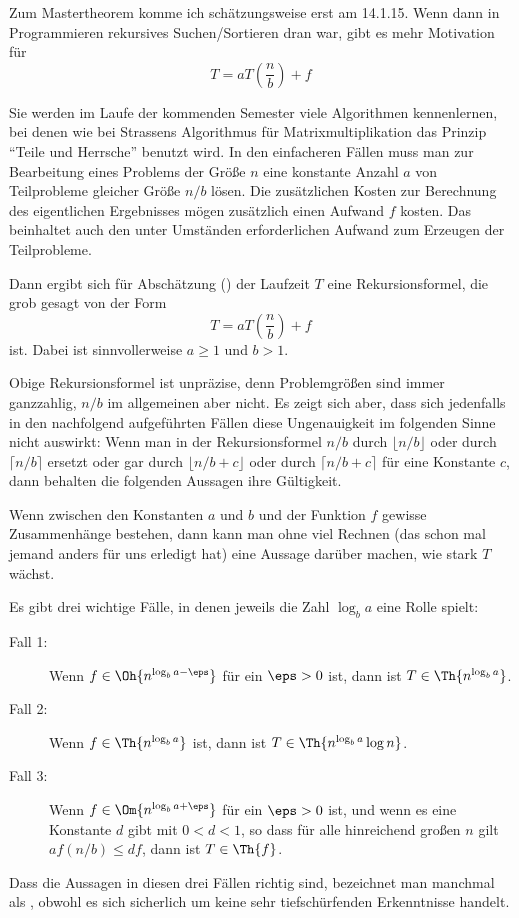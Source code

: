 \begin{tutorium}
  Zum Mastertheorem komme ich schätzungsweise erst am 14.1.15. Wenn
  dann in Programmieren rekursives Suchen/Sortieren dran war, gibt es
  mehr Motivation für
  \[
  T = a T\left(\frac{n}{b}\right) + f 
  \] 
\end{tutorium}

Sie werden im Laufe der kommenden Semester viele Algorithmen
kennenlernen, bei denen wie bei Strassens Algorithmus für
Matrixmultiplikation das Prinzip "`Teile und Herrsche"' benutzt
wird. In den einfacheren Fällen muss man zur Bearbeitung eines
Problems der Größe $n$ eine konstante Anzahl $a$ von Teilprobleme
gleicher Größe $n/b$ lösen. Die zusätzlichen Kosten zur Berechnung des
eigentlichen Ergebnisses mögen zusätzlich einen Aufwand $f$
kosten. Das beinhaltet auch den unter Umständen erforderlichen Aufwand
zum Erzeugen der Teilprobleme.

Dann ergibt sich für Abschätzung (\zB) der Laufzeit $T$ eine
Rekursionsformel, die grob gesagt von der Form
\[
T = a T\left(\frac{n}{b}\right) + f 
\] 
ist.  Dabei ist sinnvollerweise $a\geq 1$ und $b>1$. 

Obige Rekursionsformel ist unpräzise, denn Problemgrößen sind immer
ganzzahlig, $n/b$ im allgemeinen aber nicht.  Es zeigt sich aber, dass
sich jedenfalls in den nachfolgend aufgeführten Fällen diese
Ungenauigkeit im folgenden Sinne nicht auswirkt: Wenn man in der
Rekursionsformel $n/b$ durch $\lfloor n/b\rfloor$ oder durch $\lceil
n/b\rceil$ ersetzt oder gar durch $\lfloor n/b+c\rfloor$ oder durch
$\lceil n/b+c\rceil$ für eine Konstante $c$, dann behalten die
folgenden Aussagen ihre Gültigkeit.

Wenn zwischen den Konstanten $a$ und $b$ und der Funktion $f$
gewisse Zusammenhänge bestehen, dann kann man ohne viel Rechnen (das
schon mal jemand anders für uns erledigt hat) eine Aussage darüber
machen, wie stark $T$ wächst.

Es gibt drei wichtige Fälle, in denen jeweils die Zahl $\log_b a$ eine
Rolle spielt:
\begin{description}
\item[Fall 1:] Wenn $f \in \Oh{n^{\log_b a -\eps}}$ für ein
  $\eps>0$ ist, dann ist $T\in \Th{n^{\log_b a}}$.
\item[Fall 2:] Wenn $f \in \Th{n^{\log_b a}}$ ist, dann ist
  $T\in \Th{n^{\log_b a}\log n}$.
\item[Fall 3:] Wenn $f \in \Om{n^{\log_b a +\eps}}$ für ein
  $\eps>0$ ist, und wenn es eine Konstante $d$ gibt mit $0<d<1$, so
  dass für alle hinreichend großen $n$ gilt $af(n/b)\leq d f$, dann
  ist $T\in \Th{f}$.
\end{description}
%
Dass die Aussagen in diesen drei Fällen richtig sind, bezeichnet man
manchmal als , obwohl es
sich sicherlich um keine sehr tiefschürfenden Erkenntnisse handelt.


